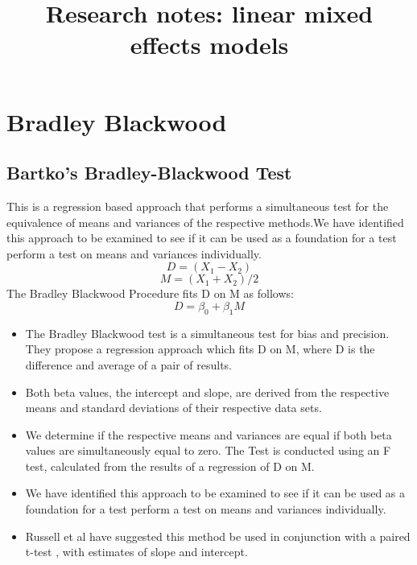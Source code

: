 \documentclass[12pt, a4paper]{report}
\title{Research notes: linear mixed effects models}
\author{ } \date{ }
\theoremstyle{plain}
\theoremstyle{definition}
\theoremstyle{remark}
\begin{document}
	\chapter{Bradley Blackwood}
	\section{Bartko's Bradley-Blackwood Test}
	This is a regression based
	approach that performs a simultaneous test for the equivalence of
	means and variances of the respective methods.We have identified
	this approach  to be examined to see if it can be used as a
	foundation for a test perform a test on
	means and variances individually.
	\begin{equation}
	D = (X_{1}-X_{2})
	\end{equation}
	\begin{equation}
	M = (X_{1} + X_{2}) /2
	\end{equation}
	The Bradley Blackwood Procedure fits D on M as follows:\\
	\begin{equation}
	D = \beta_{0} + \beta_{1}M
	\end{equation}
	\begin{itemize}
		\item The Bradley Blackwood test is a simultaneous test for bias and
		precision. They propose a regression approach which fits D on M,
		where D is the difference and average of a pair of results.
		\item Both beta values, the intercept and slope, are derived from the respective means and
		standard deviations of their respective data sets.
		\item We determine if the respective means and variances are equal if
		both beta values are simultaneously equal to zero. The Test is
		conducted using an F test, calculated from the results of a
		regression of D on M.
		\item We have identified this approach  to be examined to see if it can
		be used as a foundation for a test perform a test on means and
		variances individually.
		\item Russell et al have suggested this method be used in conjunction
		with a paired t-test , with estimates of slope and intercept.
	\end{itemize}
	
	
\end{document}
